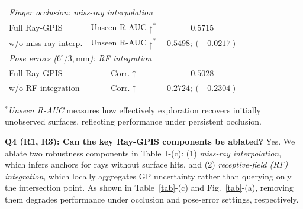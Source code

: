 \documentclass[conference]{IEEEtran}
\newcommand{\newparagraph}[1]{{\bf #1.}}
\begin{document}
\begin{table}[t]
\begin{tabularx}{\linewidth}{Xcc}
\multicolumn{3}{l}{\emph{Finger occlusion: miss-ray interpolation}} \\
Full Ray-GPIS
& Unseen R-AUC$\uparrow^*$
& $\mathbf{0.5715}$ \\
w/o miss-ray interp.
& Unseen R-AUC$\uparrow^*$
& $0.5498;(-0.0217)$ \\

\midrule

\multicolumn{3}{l}{\emph{Pose errors ($6^\circ/3,\mathrm{mm}$): RF integration}} \\
Full Ray-GPIS
& Corr.$\uparrow$
& $\mathbf{0.5028}$ \\
w/o RF integration
& Corr.$\uparrow$
& $0.2724;(-0.2304)$ \\

\bottomrule
\end{tabularx}

\vspace{0.03cm}
\noindent\footnotesize{$^*$\textit{Unseen R-AUC} measures how effectively exploration recovers initially unobserved surfaces, reflecting performance under persistent occlusion.}

\vspace{-0.31cm}
\end{table}

{\color{blue}\newparagraph{2. Ablations, Robustness, Diversity \& Runtime}}

\textbf{Q4 (R1, R3): Can the key Ray-GPIS components be ablated?}
{
Yes. We ablate two robustness components in Table~I-(c): (1) \emph{miss-ray interpolation}, which infers anchors for rays without surface hits, and (2) \emph{receptive-field (RF) integration}, which locally aggregates GP uncertainty rather than querying only the intersection point. As shown in Table~\ref{tab}-(c) and Fig.~\ref{tab}-(a), removing them degrades performance under occlusion and pose-error settings, respectively.
}



\end{document}
